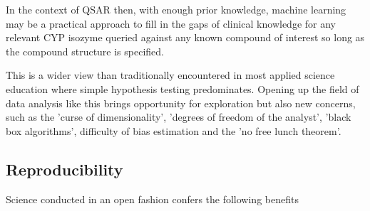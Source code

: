 In the context of QSAR then, with enough prior knowledge, machine learning may be a practical approach to fill in the gaps of clinical knowledge for any relevant CYP isozyme queried against any known compound of interest so long as the compound structure is specified.

This is a wider view than traditionally encountered in most applied science education where simple hypothesis testing predominates. Opening up the field of data analysis like this brings opportunity for exploration but also new concerns, such as the 'curse of dimensionality', 'degrees of freedom of the analyst', 'black box algorithms', difficulty of bias estimation and the 'no free lunch theorem'.\cite{Boulesteix2014}










\subsection{Reproducibility}

Science conducted in an open fashion confers the following benefits

